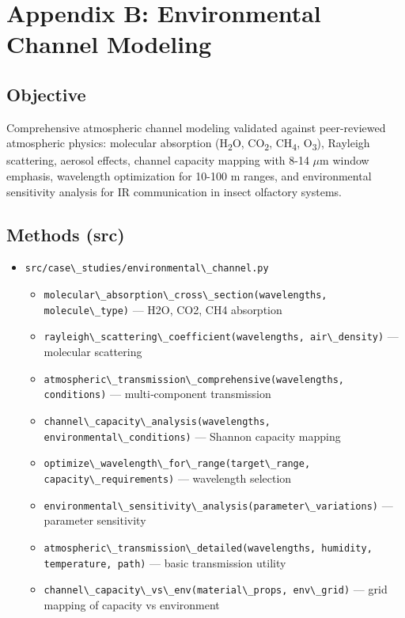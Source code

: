 \documentclass[
  13pt,
  a4paperpaper,
  12pt]{article}
\author{}
\date{}
\newcommand{\passthrough}[1]{#1}
\providecommand{\tightlist}{%
  \setlength{\itemsep}{0pt}\setlength{\parskip}{0pt}}
\let\oldsection\section
\renewcommand{\section}{\clearpage\oldsection}
\begin{document}
{
\hypersetup{linkcolor=black}
\setcounter{tocdepth}{3}
\tableofcontents
}
\section{Appendix B: Environmental Channel
Modeling}\label{sec:app_environmental_channel}

\subsection{Objective}\label{objective}

Comprehensive atmospheric channel modeling validated against
peer-reviewed atmospheric physics: molecular absorption
(H\textsubscript{2}O, CO\textsubscript{2}, CH\textsubscript{4},
O\textsubscript{3}), Rayleigh scattering, aerosol effects, channel
capacity mapping with 8-14 \(\mu\mathrm{m}\) window emphasis, wavelength
optimization for 10-100 m ranges, and environmental sensitivity analysis
for IR communication in insect olfactory systems.

\subsection{Methods (src)}\label{methods-src}

\begin{itemize}
\tightlist
\item
  \passthrough{\lstinline!src/case\_studies/environmental\_channel.py!}

  \begin{itemize}
  \tightlist
  \item
    \passthrough{\lstinline!molecular\_absorption\_cross\_section(wavelengths, molecule\_type)!}
    --- H2O, CO2, CH4 absorption
  \item
    \passthrough{\lstinline!rayleigh\_scattering\_coefficient(wavelengths, air\_density)!}
    --- molecular scattering
  \item
    \passthrough{\lstinline!atmospheric\_transmission\_comprehensive(wavelengths, conditions)!}
    --- multi‑component transmission
  \item
    \passthrough{\lstinline!channel\_capacity\_analysis(wavelengths, environmental\_conditions)!}
    --- Shannon capacity mapping
  \item
    \passthrough{\lstinline!optimize\_wavelength\_for\_range(target\_range, capacity\_requirements)!}
    --- wavelength selection
  \item
    \passthrough{\lstinline!environmental\_sensitivity\_analysis(parameter\_variations)!}
    --- parameter sensitivity
  \item
    \passthrough{\lstinline!atmospheric\_transmission\_detailed(wavelengths, humidity, temperature, path)!}
    --- basic transmission utility
  \item
    \passthrough{\lstinline!channel\_capacity\_vs\_env(material\_props, env\_grid)!}
    --- grid mapping of capacity vs environment
  \end{itemize}
\end{itemize}
\end{document}
